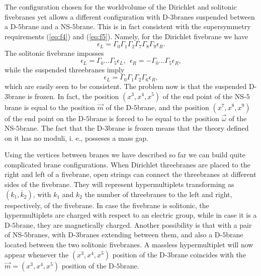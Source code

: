 The configuration chosen for the worldvolume of the Dirichlet and
solitonic fivebranes yet allows a different configuration with
D-$3$branes suspended between a D-$5$brane and a NS-$5$brane.
This is in fact consistent with the supersymmetry requirements
(\ref{eq:f4}) and (\ref{eq:f5}). Namely, for the Dirichlet
fivebrane we have
\begin{equation}
\epsilon_L = \Gamma_0 \Gamma_1 \Gamma_2 \Gamma_7 \Gamma_8
\Gamma_9 \epsilon_R. 
\label{eq:f11}
\end{equation}
The solitonic fivebrane imposses 
\begin{equation}
\epsilon_L = \Gamma_0 \ldots \Gamma_5 \epsilon_L, \: \:
\epsilon_R = - \Gamma_0 \ldots \Gamma_5 \epsilon_R,
\label{eq:f12}
\end{equation}
while the suspended threebranes imply
\begin{equation}
\epsilon_L = \Gamma_0 \Gamma_1 \Gamma_2 \Gamma_6 \epsilon_R,
\label{eq:f13}
\end{equation}
which are easily seen to be consistent. The problem now is that
the suspended D-$3$brane is frozen. In fact, the position
$(x^3,x^4,x^5)$ of the end point of the NS-$5$brane is equal to
the position $\vec{m}$ of the D-$5$brane, and the position 
$(x^7,x^8,x^9)$ of the end point on the D-$5$brane is forced to be
equal to the position $\vec{\omega}$ of the NS-$5$brane. The fact
that the D-$3$brane is frozen means that the theory defined on it
has no moduli, i. e., posseses a mass gap. 
  
Using the vertices between branes we have described so far we can
build quite complicated brane configurations. When Dirichlet
threebranes are placed to the right and left of a fivebrane, open
strings can connect the threebranes at different
sides of the fivebrane. They will represent hypermultiplets
transforming as $(k_1,\bar{k}_2)$, with $k_1$ and $k_2$ the number 
of threebranes to the left and right, respectively, of the fivebrane. In case the fivebrane is
solitonic, the hypermultiplets are charged with respect to an
electric group, while in case it is a D-$5$brane, they are
magnetically charged. Another possibility is that with a pair of
NS-$5$branes, with D-$3$branes extending between them, and also a
D-$5$brane located between the two solitonic fivebranes. A
massless hypermultiplet will now appear whenever the
$(x^3,x^4,x^5)$ position of the D-$3$brane coincides with the
$\vec{m}=(x^3,x^4,x^5)$ position of the D-$5$brane.
  
\vspace{2 mm}
  
